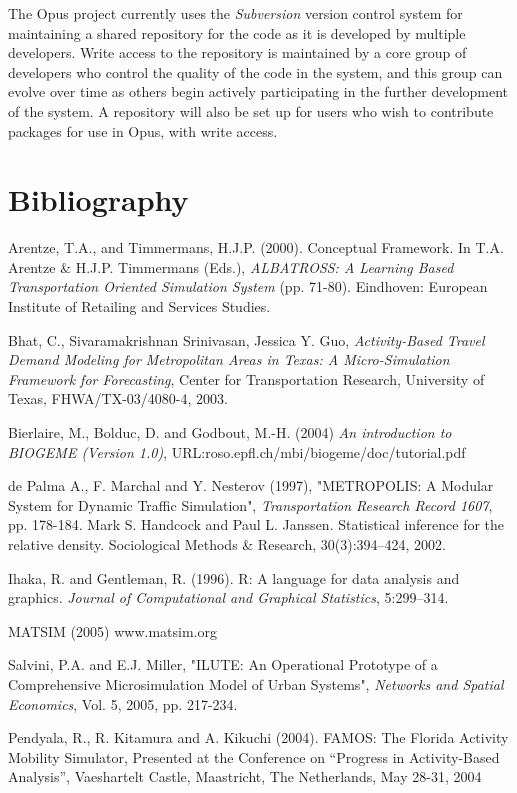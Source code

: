 The Opus project currently uses the \emph{Subversion} version control system for maintaining a shared repository for the code as it is developed by multiple developers. Write access to the repository is maintained by a core group of developers who control the quality of the code in the system, and this group can evolve over time as others begin actively participating in the further development of the system. A repository will also be set up for users who wish to contribute packages for use in Opus, with write access.


\newpage
\section{Bibliography}

Arentze, T.A., and Timmermans, H.J.P. (2000). Conceptual Framework. In T.A. Arentze \& H.J.P. Timmermans (Eds.), \emph{ALBATROSS: A Learning Based Transportation Oriented Simulation System} (pp. 71-80). Eindhoven: European Institute of Retailing and Services Studies.

Bhat, C., Sivaramakrishnan Srinivasan, Jessica Y. Guo, \emph{Activity-Based Travel Demand Modeling for Metropolitan Areas in Texas: A Micro-Simulation Framework for Forecasting}, Center for Transportation Research, University of Texas, FHWA/TX-03/4080-4, 2003.

Bierlaire, M., Bolduc, D. and Godbout, M.-H. (2004) \emph{An introduction to BIOGEME (Version 1.0)}, URL:roso.epfl.ch/mbi/biogeme/doc/tutorial.pdf

de Palma A., F. Marchal and Y. Nesterov (1997), "METROPOLIS: A Modular System for Dynamic Traffic Simulation", \emph{Transportation Research Record 1607}, pp. 178-184.
Mark S. Handcock and Paul L. Janssen. Statistical inference for the relative density. Sociological Methods \& Research, 30(3):394–424, 2002.

Ihaka, R. and Gentleman, R. (1996).  R: A language for data analysis and graphics.  \emph{Journal of Computational and Graphical Statistics}, 5:299--314.

MATSIM (2005) www.matsim.org

Salvini, P.A. and E.J. Miller, "ILUTE: An Operational Prototype of a Comprehensive Microsimulation Model of Urban Systems", \emph{Networks and Spatial Economics}, Vol. 5, 2005, pp. 217-234.

Pendyala, R., R. Kitamura and A. Kikuchi (2004). FAMOS: The Florida Activity Mobility Simulator, Presented at the Conference on “Progress in Activity-Based Analysis”, Vaeshartelt Castle, Maastricht, The Netherlands, May 28-31, 2004

